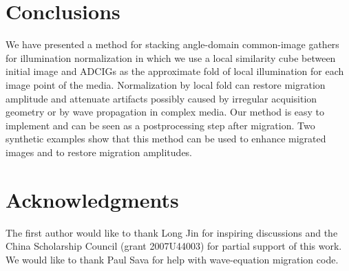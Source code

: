 

\section{Conclusions}

We have presented a method for stacking angle-domain common-image gathers for illumination normalization in which we use a local similarity cube between initial image and ADCIGs as the approximate fold of local illumination for each image point of the media. Normalization by local fold can restore migration amplitude and attenuate artifacts possibly caused by irregular acquisition geometry or by wave propagation in complex media. Our method is easy to implement and can be seen as a postprocessing step after migration. Two synthetic examples show that this method can be used to enhance migrated images and to restore migration amplitudes.

\section{Acknowledgments}

The first author would like to thank Long Jin for inspiring discussions and the China Scholarship Council (grant 2007U44003) for partial support of this work. We would like to thank Paul Sava for help with wave-equation migration code. 






